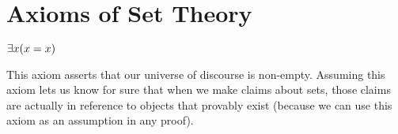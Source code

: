 \section{Axioms of Set Theory}\label{sec:axioms}

\setcounter{preaxiom}{-1}
\begin{axiom}[Existence]
    \(\exists x \pn*{x = x}\)
\end{axiom}
This axiom asserts that our universe of discourse is non-empty.
Assuming this axiom lets us know for sure that when we make claims about sets,
those claims are actually in reference to objects that provably exist
(because we can use this axiom as an assumption in any proof).


